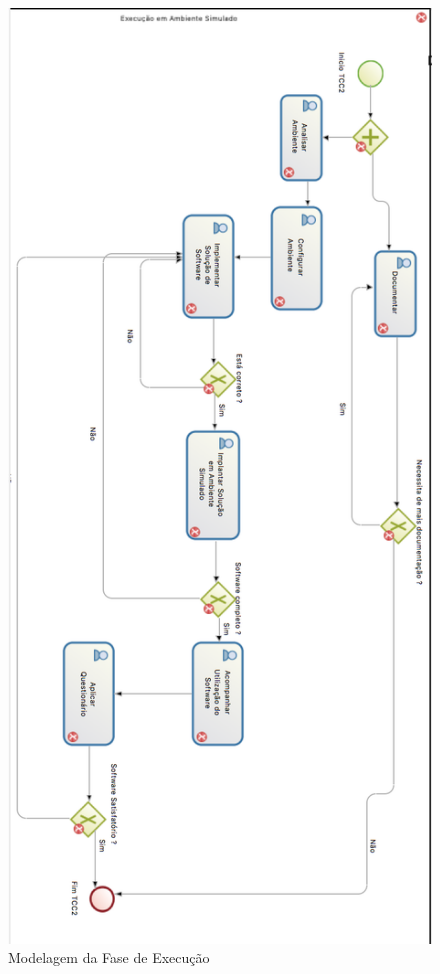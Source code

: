 \graphicspath{{figuras/}}
\begin{figure}
\centering
\includegraphics[scale=0.80]{execucao}
\caption{Modelagem da Fase de Execução}
\label{img:execucao}
\end{figure}

